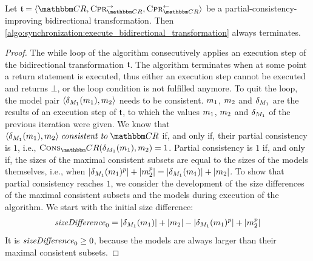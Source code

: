 \begin{lemma} %
    \label{lemma:bidirectionaltransformationtermination}
    Let $\transformation{t} = \tupled{\consistencyrelationset{CR}, \consistencypreservationrule{\consistencyrelationset{CR}}^{\rightarrow}, \consistencypreservationrule{\consistencyrelationset{CR}}^{\leftarrow}}$ be a partial-consistency-improving bidirectional transformation.
    Then \autoref{algo:synchronization:execute_bidirectional_transformation} always terminates.
\end{lemma}
\begin{proof}
    The while loop of the algorithm consecutively applies an execution step of the bidirectional transformation $\transformation{t}$.
    The algorithm terminates when at some point a return statement is executed, thus either an execution step cannot be executed and returns $\bot$, or the loop condition is not fulfilled anymore.
    To quit the loop, the model pair $\tupled{\change{\metamodel{M}{1}}(\model{m}{1}), \model{m}{2}}$ needs to be consistent.
    $\model{m}{1}$, $\model{m}{2}$ and $\change{\metamodel{M}{1}}$ are the results of an execution step of $\transformation{t}$, to which the values $\model{m}{1}$, $\model{m}{2}$ and $\change{\metamodel{M}{1}}$ of the previous iteration were given.
    We know that $\tupled{\change{\metamodel{M}{1}}(\model{m}{1}), \model{m}{2}} \consistenttomath \consistencyrelationset{CR}$ if, and only if, their partial consistency is $1$, i.e., $\function{Cons}_\consistencyrelationset{CR}(\change{\metamodel{M}{1}}(\model{m}{1}), \model{m}{2}) = 1$.
    Partial consistency is $1$ if, and only if, the sizes of the maximal consistent subsets are equal to the sizes of the models themselves, i.e., when $\abs{\change{\metamodel{M}{1}}(\model{m}{1})^p} + \abs{\model{m}{2}^p} = \abs{\change{\metamodel{M}{1}}(\model{m}{1})} + \abs{\model{m}{2}}$.
    To show that partial consistency reaches $1$, we consider the development of the size differences of the maximal consistent subsets and the models during execution of the algorithm.
    We start with the initial size difference:
    \begin{align*}
        \mathvariable{sizeDifference}_0 = \abs{\change{\metamodel{M}{1}}(\model{m}{1})} + \abs{\model{m}{2}} - \abs{\change{\metamodel{M}{1}}(\model{m}{1})^p} + \abs{\model{m}{2}^p}
    \end{align*}
    It is $\mathit{sizeDifference}_0 \geq 0$, because the models are always larger than their maximal consistent subsets.

\end{proof}
